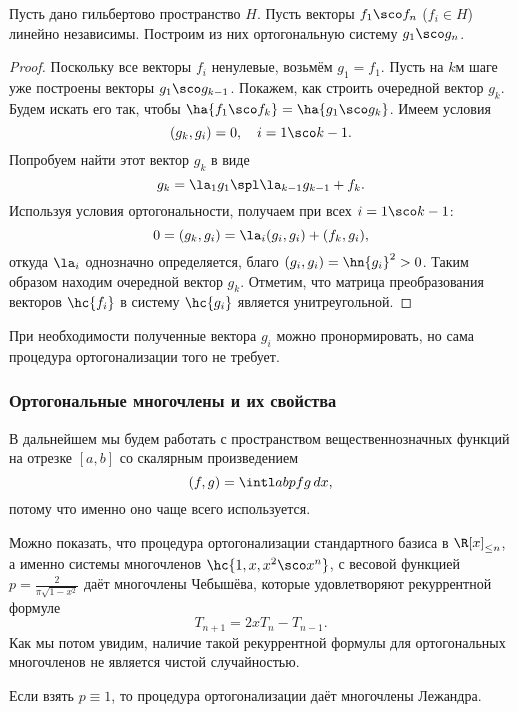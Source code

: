 \documentclass[a4paper]{article}
\newcommand{\dx}{\,dx}
\begin{document}
\begin{lemma}
Пусть дано гильбертово пространство $H$.
Пусть векторы $f_1\sco f_n$ ($f_i \in H$) линейно независимы.
Построим из них ортогональную систему $g_1\sco g_n$.
\end{lemma}
\begin{proof}
Поскольку все векторы $f_i$ ненулевые, возьмём $g_1 = f_1$.
Пусть на $k$\д м шаге уже построены векторы $g_1\sco g_{k-1}$. Покажем, как строить очередной вектор $g_k$.
Будем искать его так, чтобы $\ha{f_1\sco f_k} = \ha{g_1\sco g_k}$.
Имеем условия
$$(g_k, g_i) = 0, \quad i = 1\sco k-1.$$
Попробуем найти этот вектор $g_k$ в виде
$$g_k = \la_1 g_1\spl \la_{k-1} g_{k-1} + f_k.$$
Используя условия ортогональности, получаем при всех $i = 1\sco k-1$:
$$0 = (g_k, g_i) = \la_i (g_i,g_i) + (f_k,g_i),$$
откуда $\la_i$ однозначно определяется, благо $(g_i, g_i) = \hn{g_i}^2 > 0$.
Таким образом находим очередной вектор $g_k$. Отметим, что матрица преобразования векторов $\hc{f_i}$ в систему $\hc{g_i}$
является унитреугольной.
\end{proof}

\begin{note}
При необходимости полученные вектора $g_i$ можно пронормировать, но сама процедура ортогонализации того не требует.
\end{note}

\subsubsection{Ортогональные многочлены и их свойства}

В дальнейшем мы будем работать с пространством вещественнозначных функций на отрезке $[a,b]$
со скалярным произведением
$$(f,g) = \intl ab pfg\dx,$$
потому что именно оно чаще всего используется.

\begin{ex}
Можно показать, что процедура ортогонализации стандартного базиса в $\R[x]_{\le n}$, а именно системы многочленов $\hc{1,x,x^2\sco x^n}$,
с весовой функцией $p = \frac{2}{\pi\sqrt{1-x^2}}$ даёт многочлены Чебышёва, которые удовлетворяют рекуррентной формуле
$$T_{n+1} = 2x T_n - T_{n-1}.$$
Как мы потом увидим, наличие такой рекуррентной формулы для ортогональных многочленов не является чистой случайностью.
\end{ex}

\begin{ex}
Если взять $p \equiv 1$, то процедура ортогонализации даёт многочлены Лежандра.
\end{ex}
\end{document}
